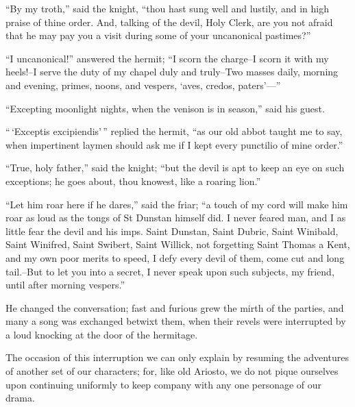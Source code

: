 ``By my troth,'' said the knight, ``thou hast sung well and lustily, and
in high praise of thine order. And, talking of the devil, Holy Clerk,
are you not afraid that he may pay you a visit during some of your
uncanonical pastimes?''

``I uncanonical!'' answered the hermit; ``I scorn the charge--I scorn it
with my heels!--I serve the duty of my chapel duly and truly--Two masses
daily, morning and evening, primes, noons, and vespers, `aves, credos,
paters'---''

``Excepting moonlight nights, when the venison is in season,'' said his
guest.

``\,`Exceptis excipiendis'\,'' replied the hermit, ``as our old abbot
taught me to say, when impertinent laymen should ask me if I kept every
punctilio of mine order.''

``True, holy father,'' said the knight; ``but the devil is apt to keep
an eye on such exceptions; he goes about, thou knowest, like a roaring
lion.''

``Let him roar here if he dares,'' said the friar; ``a touch of my cord
will make him roar as loud as the tongs of St Dunstan himself did. I
never feared man, and I as little fear the devil and his imps. Saint
Dunstan, Saint Dubric, Saint Winibald, Saint Winifred, Saint Swibert,
Saint Willick, not forgetting Saint Thomas a Kent, and my own poor
merits to speed, I defy every devil of them, come cut and long
tail.--But to let you into a secret, I never speak upon such subjects,
my friend, until after morning vespers.''

He changed the conversation; fast and furious grew the mirth of the
parties, and many a song was exchanged betwixt them, when their revels
were interrupted by a loud knocking at the door of the hermitage.

The occasion of this interruption we can only explain by resuming the
adventures of another set of our characters; for, like old Ariosto, we
do not pique ourselves upon continuing uniformly to keep company with
any one personage of our drama.
